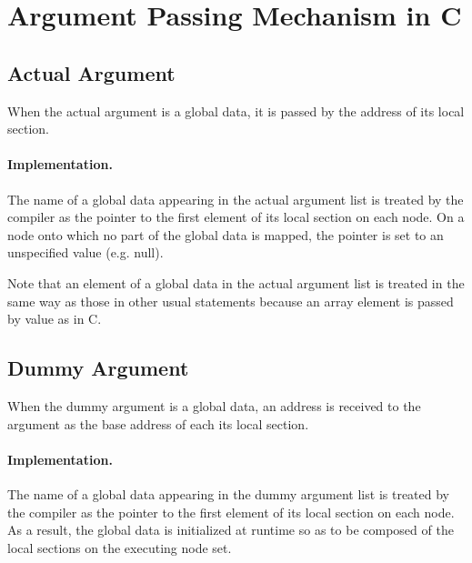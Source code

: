 \section{Argument Passing Mechanism in {\XMP} C}

\subsection{Actual Argument}

When the actual argument is a global data, it is passed by the address
of its local section.

\paragraph{Implementation.}

The name of a global data appearing in the actual argument list is
treated by the {\XMP} compiler as the pointer to the first element of
its local section on each node.
%
On a node onto which no part of the global data is mapped, the pointer
is set to an unspecified value (e.g. null).

Note that an element of a global data in the actual argument list is
treated in the same way as those in other usual statements because an
array element is passed by value as in C.

\subsection{Dummy Argument}

When the dummy argument is a global data, an address is received to the
argument as the base address of each its local section.

\paragraph{Implementation.}

The name of a global data appearing in the dummy argument list is
treated by the {\XMP} compiler as the pointer to the first element of
its local section on each node.
%
As a result, the global data is initialized at runtime so as to be
composed of the local sections on the executing node set.
